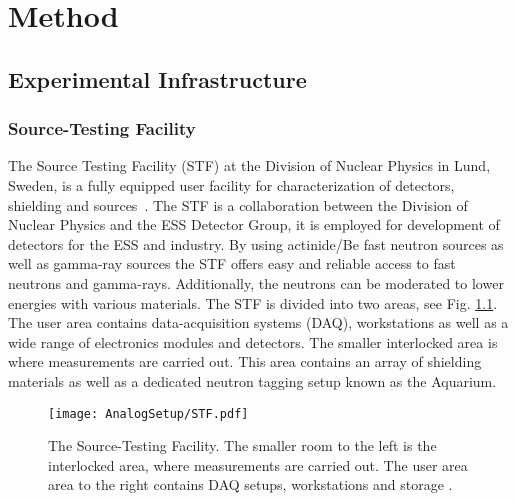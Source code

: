 \documentclass[main.tex]{subfiles}
\begin{document}
\chapter{Method}
\section{Experimental Infrastructure}

\subsection{Source-Testing Facility}

The Source Testing Facility (STF) at the Division of Nuclear Physics in Lund, Sweden, is a fully equipped user facility for characterization of detectors, shielding and sources~\cite{Messi}.
The STF is a collaboration between the Division of Nuclear Physics and the ESS Detector Group, it is employed for development of detectors for the ESS and industry. By using actinide/Be fast neutron sources as well as gamma-ray sources the STF offers easy and reliable access to fast neutrons and gamma-rays. Additionally, the neutrons can be moderated to lower energies with various materials. The STF is divided into two areas, see Fig. \ref{fig:STF}. The user area contains data-acquisition systems (DAQ), workstations as well as a wide range of electronics modules and detectors. The smaller interlocked area is where measurements are carried out. This area contains an array of shielding materials as well as a dedicated neutron tagging setup known as the Aquarium.

\begin{figure}[ht]
	\center
    	\texttt{[image: AnalogSetup/STF.pdf]}
	\caption[The Source-Testing Facility.]{The Source-Testing Facility. The smaller room to the left is the interlocked area, where measurements are carried out. The user area area to the right contains DAQ setups, workstations and storage \cite{Messi}.}
	\label{fig:STF}
\end{figure}
\end{document}
